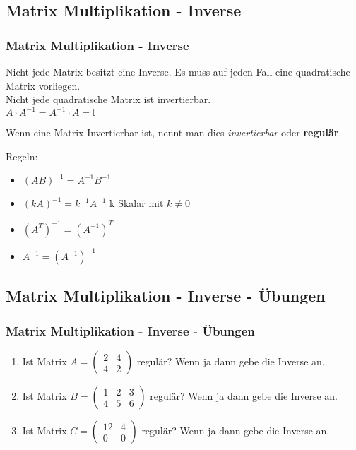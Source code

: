 \subsection{Matrix Multiplikation - Inverse}
\begin{frame}
\frametitle{Matrix Multiplikation - Inverse}
Nicht jede Matrix besitzt eine Inverse. Es muss auf jeden Fall eine quadratische Matrix vorliegen.\\
Nicht jede quadratische Matrix ist invertierbar.\\
$A\cdot A^{-1} = A^{-1}\cdot A = \mathds{I}$

Wenn eine Matrix Invertierbar ist, nennt man dies \textit{invertierbar} oder \textbf{regulär}.

Regeln:
\begin{itemize}
\item $(AB)^{-1} = A^{-1}B^{-1}$
\item $(kA)^{-1} = k^{-1}A^{-1}$ k Skalar mit $k\neq0$
\item $(A^T)^{-1} = (A^{-1})^T$
\item $A^{-1} = (A^{-1})^{-1}$
\end{itemize}
\end{frame}

\subsection{Matrix Multiplikation - Inverse - Übungen}
\begin{frame}
\frametitle{Matrix Multiplikation - Inverse - Übungen}
\begin{enumerate}
\item Ist Matrix $A = \begin{pmatrix} 2 & 4 \\ 4 & 2 \end{pmatrix}$ regulär? Wenn ja dann gebe die Inverse an.
\item Ist Matrix $B = \begin{pmatrix} 1 & 2 & 3 \\ 4 & 5 & 6 \end{pmatrix}$ regulär? Wenn ja dann gebe die Inverse an.
\item Ist Matrix $C = \begin{pmatrix} 12 & 4 \\ 0 & 0  \end{pmatrix}$ regulär? Wenn ja dann gebe die Inverse an.
\end{enumerate}
\end{frame}


